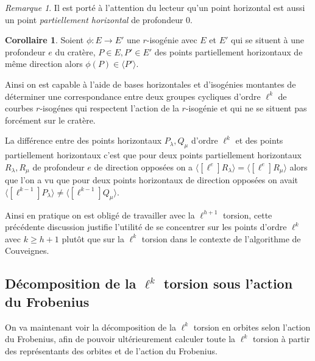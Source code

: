 \documentclass[10pt,a4paper]{book}
\theoremstyle{plain}
\theoremstyle{definition}
\theoremstyle{definition}
\newtheorem{cor}[thm]{Corollaire}
\theoremstyle{definition}
\theoremstyle{definition}
\theoremstyle{remark}
\newtheorem{rem}[thm]{Remarque}
\theoremstyle{remark}
\theoremstyle{definition}
\begin{document}
\begin{rem}
Il est porté à l'attention du lecteur qu'un point horizontal est aussi un point
 \emph{partiellement horizontal} de profondeur $0$.
\end{rem}

\begin{cor}
\label{cor:par:hor}
Soient $\phi: E \rightarrow E'$ une $r$-isogénie avec $E$ et $E'$ qui se situent à une profondeur $e$ du cratère, $P \in E,P' \in E'$ des points partiellement horizontaux de même direction alors $\phi(P) \in \langle P' \rangle$. 
\end{cor}

Ainsi on est capable à l'aide de bases horizontales et d'isogénies montantes de déterminer une correspondance entre deux groupes cycliques d'ordre $\ell^k$ de courbes $r$-isogénes qui respectent l'action de la $r$-isogénie et qui ne se situent pas forcément sur le cratère. 

La différence entre des points horizontaux $P_{\lambda}, Q_{\mu}$ d'ordre $\ell^k$ et des points partiellement horizontaux c'est que pour deux points partiellement horizontaux $R_{\lambda}, R_{\mu}$ de profondeur $e$ de direction opposées on a $\langle [\ell^{e}]R_{\lambda} \rangle = \langle [\ell^{e}]R_{\mu} \rangle$ alors que l'on a vu que pour deux points horizontaux de direction opposées on avait $\langle [\ell^{k-1}]P_{\lambda} \rangle \neq \langle [\ell^{k-1}]Q_{\mu} \rangle $. 

Ainsi en pratique on est obligé de travailler avec la $\ell^{h+1}$ torsion, cette précédente discussion justifie l'utilité de se concentrer sur les points d'ordre $\ell^{k}$ avec $k \geqslant h+1$ plutôt que sur la $\ell^k$ torsion dans le contexte de l'algorithme de Couveignes.

\subsection{Décomposition de la $\ell^k$ torsion sous l'action du Frobenius}
\label{sub:classes}
On va maintenant voir la décomposition de la $\ell^k$ torsion en orbites selon l'action du Frobenius, afin de pouvoir ultérieurement calculer toute la $\ell^k$ torsion à partir des représentants des orbites et de l'action du Frobenius. 
\end{document}
